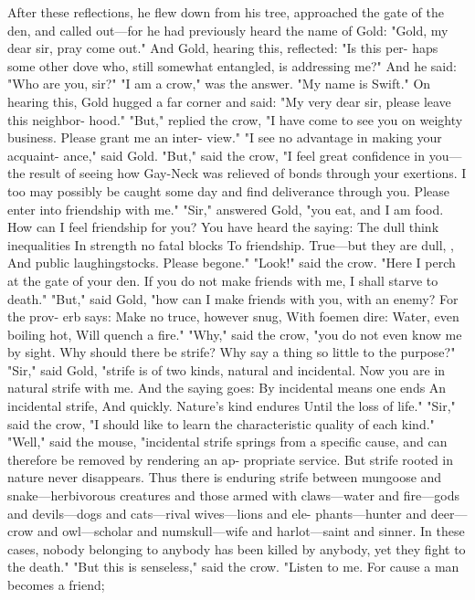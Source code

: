 \documentclass{book}
\begin{document}
After these reflections, he flew down from his tree,
approached the gate of the den, and called out---for
he had previously heard the name of Gold: "Gold,
my dear sir, pray come out."
And Gold, hearing this, reflected: "Is this per-
haps some other dove who, still somewhat entangled,
is addressing me?" And he said: "Who are you, sir?"
"I am a crow," was the answer. "My name is Swift."
On hearing this, Gold hugged a far corner and
said: "My very dear sir, please leave this neighbor-
hood." "But," replied the crow, "I have come to see
you on weighty business. Please grant me an inter-
view."
"I see no advantage in making your acquaint-
ance," said Gold. "But," said the crow, "I feel great
confidence in you---the result of seeing how Gay-Neck
was relieved of bonds through your exertions. I too
may possibly be caught some day and find deliverance
through you. Please enter into friendship with me."
"Sir," answered Gold, "you eat, and I am food.
How can I feel friendship for you? You have heard
the saying:
The dull think inequalities
In strength no fatal blocks
To friendship. True---but they are dull,               ,
And public laughingstocks.
Please begone."
"Look!" said the crow. "Here I perch at the gate
of your den. If you do not make friends with me, I
shall starve to death." "But," said Gold, "how can I
make friends with you, with an enemy? For the prov-
erb says:
Make no truce, however snug,
With foemen dire:
Water, even boiling hot,
Will quench a fire."
"Why," said the crow, "you do not even know me
by sight. Why should there be strife? Why say a
thing so little to the purpose?"
"Sir," said Gold, "strife is of two kinds, natural
and incidental. Now you are in natural strife with
me. And the saying goes:
By incidental means one ends
An incidental strife,
And quickly. Nature's kind endures
Until the loss of life."
"Sir," said the crow, "I should like to learn the
characteristic quality of each kind." "Well," said the
mouse, "incidental strife springs from a specific cause,
and can therefore be removed by rendering an ap-
propriate service. But strife rooted in nature never
disappears. Thus there is enduring strife between
mungoose and snake---herbivorous creatures and
those armed with claws---water and fire---gods and
devils---dogs and cats---rival wives---lions and ele-
phants---hunter and deer---crow and owl---scholar
and numskull---wife and harlot---saint and sinner.
In these cases, nobody belonging to anybody has been
killed by anybody, yet they fight to the death."
"But this is senseless," said the crow. "Listen to
me.
For cause a man becomes a friend;
\end{document}
